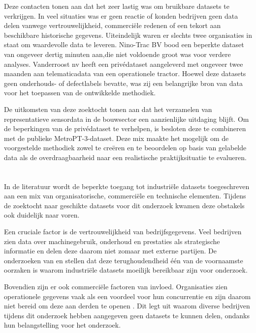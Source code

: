 \newpage

Deze contacten tonen aan dat het zeer lastig was om bruikbare datasets te verkrijgen. In veel situaties was er geen reactie of konden bedrijven geen data delen vanwege vertrouwelijkheid, commerciële redenen of een tekort aan beschikbare historische gegevens. Uiteindelijk waren er slechts twee organisaties in staat om waardevolle data te leveren. Nino-Trac BV bood een beperkte dataset van ongeveer dertig minuten aan,die niet voldoende groot was voor verdere analyses. Vanderroost nv heeft een privédataset aangeleverd met ongeveer twee maanden aan telematicadata van een operationele tractor. Hoewel deze datasets geen onderhouds- of defectlabels bevatte, was zij een belangrijke bron van data voor het toepassen van de ontwikkelde methodiek.

De uitkomsten van deze zoektocht tonen aan dat het verzamelen van representatieve sensordata in de bouwsector een aanzienlijke uitdaging blijft. Om de beperkingen van de privédataset te verhelpen, is besloten deze te combineren met de publieke MetroPT-3-dataset. Deze mix maakte het mogelijk om de voorgestelde methodiek zowel te creëren en te beoordelen op basis van gelabelde data als de overdraagbaarheid naar een realistische praktijksituatie te evalueren.

\section{}%
\label{sec: Obstakels bij de toegang tot data}

In de literatuur wordt de beperkte toegang tot industriële datasets toegeschreven aan een mix van organisatorische, commerciële en technische elementen. Tijdens de zoektocht naar geschikte datasets voor dit onderzoek kwamen deze obstakels ook duidelijk naar voren.

Een cruciale factor is de vertrouwelijkheid van bedrijfsgegevens. Veel bedrijven zien data over machinegebruik, onderhoud en prestaties als strategische informatie en delen deze daarom niet zomaar met externe partijen. De onderzoeken van \textcite{Elahi2023} en \textcite{Hu2024} stellen dat deze terughoudendheid één van de voornaamste oorzaken is waarom industriële datasets moeilijk bereikbaar zijn voor onderzoek.

Bovendien zijn er ook commerciële factoren van invloed. Organisaties zien operationele gegevens vaak als een voordeel voor hun concurrentie en zijn daarom niet bereid om deze aan derden te openen \autocite{Meddaoui2024, Nayak2024}. Dit legt uit waarom diverse bedrijven tijdens dit onderzoek hebben aangegeven geen datasets te kunnen delen, ondanks hun belangstelling voor het onderzoek.

